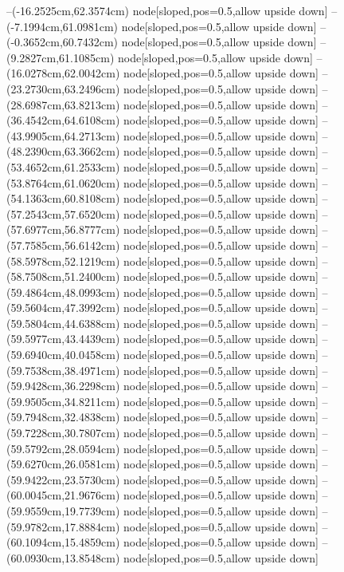 --(-16.2525cm,62.3574cm) node[sloped,pos=0.5,allow upside down]{\ArrowIn}
--(-7.1994cm,61.0981cm) node[sloped,pos=0.5,allow upside down]{\ArrowIn}
--(-0.3652cm,60.7432cm) node[sloped,pos=0.5,allow upside down]{\ArrowIn}
--(9.2827cm,61.1085cm) node[sloped,pos=0.5,allow upside down]{\ArrowIn}
--(16.0278cm,62.0042cm) node[sloped,pos=0.5,allow upside down]{\ArrowIn}
--(23.2730cm,63.2496cm) node[sloped,pos=0.5,allow upside down]{\ArrowIn}
--(28.6987cm,63.8213cm) node[sloped,pos=0.5,allow upside down]{\ArrowIn}
--(36.4542cm,64.6108cm) node[sloped,pos=0.5,allow upside down]{\ArrowIn}
--(43.9905cm,64.2713cm) node[sloped,pos=0.5,allow upside down]{\ArrowIn}
--(48.2390cm,63.3662cm) node[sloped,pos=0.5,allow upside down]{\ArrowIn}
--(53.4652cm,61.2533cm) node[sloped,pos=0.5,allow upside down]{\ArrowIn}
--(53.8764cm,61.0620cm) node[sloped,pos=0.5,allow upside down]{\arrowIn}
--(54.1363cm,60.8108cm) node[sloped,pos=0.5,allow upside down]{\arrowIn}
--(57.2543cm,57.6520cm) node[sloped,pos=0.5,allow upside down]{\ArrowIn}
--(57.6977cm,56.8777cm) node[sloped,pos=0.5,allow upside down]{\arrowIn}
--(57.7585cm,56.6142cm) node[sloped,pos=0.5,allow upside down]{\arrowIn}
--(58.5978cm,52.1219cm) node[sloped,pos=0.5,allow upside down]{\ArrowIn}
--(58.7508cm,51.2400cm) node[sloped,pos=0.5,allow upside down]{\arrowIn}
--(59.4864cm,48.0993cm) node[sloped,pos=0.5,allow upside down]{\ArrowIn}
--(59.5604cm,47.3992cm) node[sloped,pos=0.5,allow upside down]{\arrowIn}
--(59.5804cm,44.6388cm) node[sloped,pos=0.5,allow upside down]{\ArrowIn}
--(59.5977cm,43.4439cm) node[sloped,pos=0.5,allow upside down]{\ArrowIn}
--(59.6940cm,40.0458cm) node[sloped,pos=0.5,allow upside down]{\ArrowIn}
--(59.7538cm,38.4971cm) node[sloped,pos=0.5,allow upside down]{\ArrowIn}
--(59.9428cm,36.2298cm) node[sloped,pos=0.5,allow upside down]{\ArrowIn}
--(59.9505cm,34.8211cm) node[sloped,pos=0.5,allow upside down]{\ArrowIn}
--(59.7948cm,32.4838cm) node[sloped,pos=0.5,allow upside down]{\ArrowIn}
--(59.7228cm,30.7807cm) node[sloped,pos=0.5,allow upside down]{\ArrowIn}
--(59.5792cm,28.0594cm) node[sloped,pos=0.5,allow upside down]{\ArrowIn}
--(59.6270cm,26.0581cm) node[sloped,pos=0.5,allow upside down]{\ArrowIn}
--(59.9422cm,23.5730cm) node[sloped,pos=0.5,allow upside down]{\ArrowIn}
--(60.0045cm,21.9676cm) node[sloped,pos=0.5,allow upside down]{\ArrowIn}
--(59.9559cm,19.7739cm) node[sloped,pos=0.5,allow upside down]{\ArrowIn}
--(59.9782cm,17.8884cm) node[sloped,pos=0.5,allow upside down]{\ArrowIn}
--(60.1094cm,15.4859cm) node[sloped,pos=0.5,allow upside down]{\ArrowIn}
--(60.0930cm,13.8548cm) node[sloped,pos=0.5,allow upside down]{\ArrowIn}
